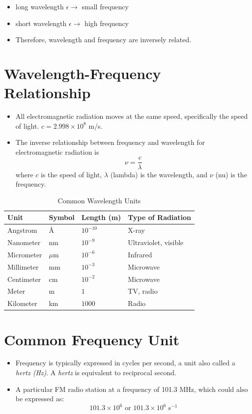 \documentclass[
	chapter=7,
	title={Quantum Theory {\&} the Electronic Structure of Atoms},
	showanswers=true,
]{chem122notes}
\begin{document}
\begin{itemize}
	\item long wavelength $\epsilon \rightarrow$ small frequency
	\item short wavelength $\epsilon \rightarrow$ high frequency
	\item Therefore, wavelength and frequency are inversely related.
\end{itemize}

\section{Wavelength-Frequency Relationship}\label{sec:wavelength-frequency-relationship}
\begin{itemize}
	\item All electromagnetic radiation moves at the same speed, specifically the speed of light. $c = 2.998 \times 10^{8}$ m/s.
	\item The inverse relationship between frequency and wavelength for electromagnetic radiation is
	\begin{equation}
		\nu = \frac{c}{\lambda}
		\label{eq:wavelength-frequency-relationship}
	\end{equation}
	where $c$ is the speed of light, $\lambda$ (lambda) is the wavelength, and $\nu$ (nu) is the frequency.
\end{itemize}

\begin{table}[H]
	\centering
	\caption{Common Wavelength Units}
	\label{tab:common-wavelength-units}
	\begin{tabular}{llll}
		\textbf{Unit} & \textbf{Symbol} & \textbf{Length (m)} & \textbf{Type of Radiation}\\
		\hline
		Angstrom & \si{\angstrom} & $10^{-10}$ & X-ray\\
		Nanometer & nm & $10^{-9}$ & Ultraviolet, visible\\
		Micrometer & $\mu$m & $10^{-6}$ & Infrared\\
		Millimeter & mm & $10^{-3}$ & Microwave\\
		Centimeter & cm & $10^{-2}$ & Microwave\\
		Meter & m & $1$ & TV, radio\\
		Kilometer & km & $1000$ & Radio\\
	\end{tabular}
\end{table}

\section{Common Frequency Unit}\label{sec:common-frequency-unit}
\begin{itemize}
	\item Frequency is typically expressed in cycles per second, a unit also called a \emph{hertz (Hz)}. A \emph{hertz} is equivalent to reciprocal second.
	\item A particular FM radio station at a frequency of 101.3 MHz, which could also be expressed as:
	\[ 101.3 \times 10^{6} \mbox{ or } 101.3 \times 10^{6}\ s^{-1} \]
\end{itemize}
\end{document}
